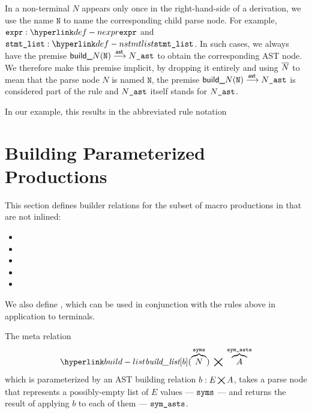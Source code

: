 In a non-terminal $N$ appears only once in the right-hand-side of a derivation,
we use the name $\texttt{N}$ to name the corresponding child parse node.
For example, $\namednode{\vexpr}{\Nexpr}$ and $\namednode{\vstmtlist}{\Nstmtlist}$.
In such cases, we always have the premise $\textsf{build\_}N(\texttt{N}) \astarrow \astversion{N}$
to obtain the corresponding AST node.
We therefore make this premise implicit, by dropping it entirely and using $\astof{N}$ to mean that
the parse node $N$ is named $\texttt{N}$, the premise $\textsf{build\_}N(\texttt{N}) \astarrow \astversion{N}$
is considered part of the rule and $\astversion{N}$ itself stands for $\astversion{N}$.

In our example, this results in the abbreviated rule notation
\begin{mathpar}
\end{mathpar}

\section{Building Parameterized Productions\label{sec:BuildingParameterizedProductions}}
This section defines builder relations for the
subset of macro productions in 
that are not inlined:
\begin{itemize}
  \item {}
  \item {}
  \item {}
  \item {}
  \item {}
\end{itemize}

We also define ,
which can be used in conjunction with the rules above in application
to terminals.

\hypertarget{build-list}{}
The meta relation
\[
\buildlist[b](\overname{N}{\vsyms}) \;\aslrel\; \overname{A}{\vsymasts}
\]
which is parameterized by an AST building relation $b : E \aslrel A$,
takes a parse node that represents a possibly-empty list of $E$ values --- $\vsyms$ --- and returns the result of applying $b$
to each of them --- $\vsymasts$.

